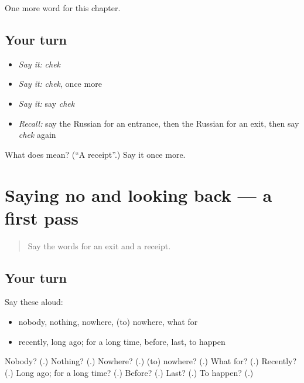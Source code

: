 \begin{grammarlens}[title={What you've built}]
One more word for this chapter.
\end{grammarlens}

\subsection*{Your turn}
\begin{itemize}
\raggedright
  \item \emph{Say it:} \emph{chek}
  \item \emph{Say it:} \emph{chek}, once more
  \item \emph{Say it:} say \emph{chek}
  \item \emph{Recall:} say the Russian for an entrance, then the Russian for an exit, then say \emph{chek} again
\end{itemize}

\begin{tcolorbox}[breakable,colback=teal!4,colframe=teal!35!black,title={Before you move on}]
What does  mean? (\textquotedblleft{}A receipt\textquotedblright{}.) Say it once more.
\end{tcolorbox}
\section[(dialogue)]{Saying no and looking back — a first pass}

\label{lesson:RU-R139-first-pass-saying-no-and-looking-back}



\begin{quote}
Say the words for an exit and a receipt.
\end{quote}

\subsection*{Your turn}
Say these aloud:

\begin{itemize}
\raggedright
  \item nobody, nothing, nowhere, (to) nowhere, what for
  \item recently, long ago; for a long time, before, last, to happen
\end{itemize}

\begin{tcolorbox}[breakable,colback=teal!4,colframe=teal!35!black,title={Before you move on}]
Nobody? (\textbf{}.) Nothing? (\textbf{}.) Nowhere? (\textbf{}.) (to) nowhere? (\textbf{}.) What for? (\textbf{}.) Recently? (\textbf{}.) Long ago; for a long time? (\textbf{}.) Before? (\textbf{}.) Last? (\textbf{}.) To happen? (\textbf{}.)
\end{tcolorbox}
